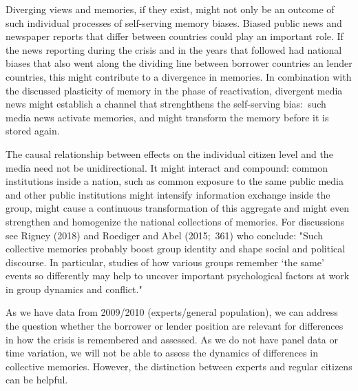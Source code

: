 Diverging views and memories, if they exist, might not only be an outcome of
such individual processes of self-serving memory biases. Biased public news
and newspaper reports that differ between countries could play an important
role. If the news reporting during the crisis and in the years that followed
had national biases that also went along the dividing line between borrower
countries an lender countries, this might contribute to a divergence in
memories. In combination with the discussed plasticity of memory in the
phase of reactivation, divergent media news might establish a channel that
strenghthens the self-serving bias:\ such media news activate memories, and
might transform the memory before it is stored again. 

The causal relationship between effects on the individual citizen
level and the media need not be unidirectional. It might  interact and
compound: common institutions inside a nation, such as common exposure to
the same public media and other public institutions might intensify
information exchange inside the group, might cause a continuous
transformation of this aggregate and might even strengthen and homogenize
the national collections of memories. For discussions see Rigney (2018) and
Roediger and Abel (2015;\ 361) who conclude: "Such collective memories
probably boost group identity and shape social and political discourse. In
particular, studies of how various groups remember `the same' events so
differently may help to uncover important psychological factors at work in
group dynamics and conflict." 

As we have data from 2009/2010 (experts/general population), we can address
the question whether the borrower or lender position are relevant for
differences in how the crisis is remembered and assessed. As we do not have
panel data or time variation, we will not be able to assess the dynamics of
differences in collective memories. However, the distinction between experts
and regular citizens can be helpful. 
